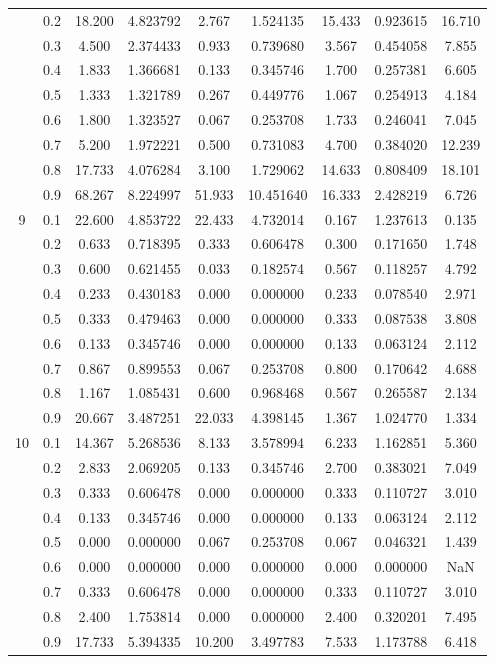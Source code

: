 \begin{longtable}{ | c | c || c | c | c | c | c | c | c | }
 & 0.2 & 18.200 & 4.823792 & 2.767 & 1.524135 & 15.433 & 0.923615 & 16.710 \\
 & 0.3 & 4.500 & 2.374433 & 0.933 & 0.739680 & 3.567 & 0.454058 & 7.855 \\
 & 0.4 & 1.833 & 1.366681 & 0.133 & 0.345746 & 1.700 & 0.257381 & 6.605 \\
 & 0.5 & 1.333 & 1.321789 & 0.267 & 0.449776 & 1.067 & 0.254913 & 4.184 \\
 & 0.6 & 1.800 & 1.323527 & 0.067 & 0.253708 & 1.733 & 0.246041 & 7.045 \\
 & 0.7 & 5.200 & 1.972221 & 0.500 & 0.731083 & 4.700 & 0.384020 & 12.239 \\
 & 0.8 & 17.733 & 4.076284 & 3.100 & 1.729062 & 14.633 & 0.808409 & 18.101 \\
 & 0.9 & 68.267 & 8.224997 & 51.933 & 10.451640 & 16.333 & 2.428219 & 6.726 \\
 \hline
\multirow{9}{*}{9} & 0.1 & 22.600 & 4.853722 & 22.433 & 4.732014 & 0.167 & 1.237613 & 0.135 \\
 & 0.2 & 0.633 & 0.718395 & 0.333 & 0.606478 & 0.300 & 0.171650 & 1.748 \\
 & 0.3 & 0.600 & 0.621455 & 0.033 & 0.182574 & 0.567 & 0.118257 & 4.792 \\
 & 0.4 & 0.233 & 0.430183 & 0.000 & 0.000000 & 0.233 & 0.078540 & 2.971 \\
 & 0.5 & 0.333 & 0.479463 & 0.000 & 0.000000 & 0.333 & 0.087538 & 3.808 \\
 & 0.6 & 0.133 & 0.345746 & 0.000 & 0.000000 & 0.133 & 0.063124 & 2.112 \\
 & 0.7 & 0.867 & 0.899553 & 0.067 & 0.253708 & 0.800 & 0.170642 & 4.688 \\
 & 0.8 & 1.167 & 1.085431 & 0.600 & 0.968468 & 0.567 & 0.265587 & 2.134 \\
 & 0.9 & 20.667 & 3.487251 & 22.033 & 4.398145 & 1.367 & 1.024770 & 1.334 \\
 \hline
\multirow{9}{*}{10} & 0.1 & 14.367 & 5.268536 & 8.133 & 3.578994 & 6.233 & 1.162851 & 5.360 \\
 & 0.2 & 2.833 & 2.069205 & 0.133 & 0.345746 & 2.700 & 0.383021 & 7.049 \\
 & 0.3 & 0.333 & 0.606478 & 0.000 & 0.000000 & 0.333 & 0.110727 & 3.010 \\
 & 0.4 & 0.133 & 0.345746 & 0.000 & 0.000000 & 0.133 & 0.063124 & 2.112 \\
 & 0.5 & 0.000 & 0.000000 & 0.067 & 0.253708 & 0.067 & 0.046321 & 1.439 \\
 & 0.6 & 0.000 & 0.000000 & 0.000 & 0.000000 & 0.000 & 0.000000 & NaN \\
 & 0.7 & 0.333 & 0.606478 & 0.000 & 0.000000 & 0.333 & 0.110727 & 3.010 \\
 & 0.8 & 2.400 & 1.753814 & 0.000 & 0.000000 & 2.400 & 0.320201 & 7.495 \\
 & 0.9 & 17.733 & 5.394335 & 10.200 & 3.497783 & 7.533 & 1.173788 & 6.418 \\
 \hline
\hline
\end{longtable}
 
